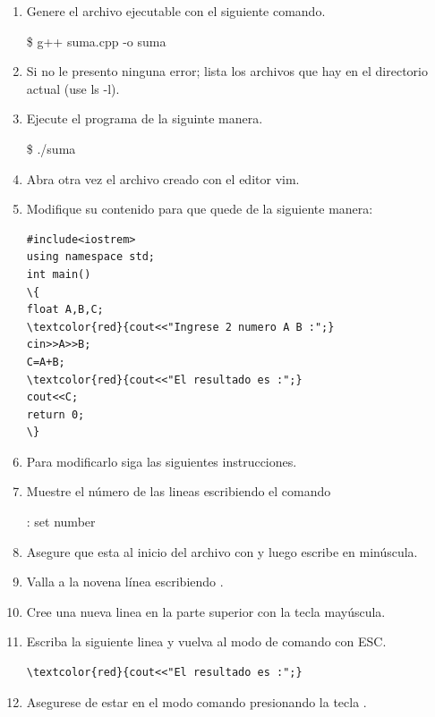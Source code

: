 \documentclass[a4paper,12pt,spanish]{article}
\begin{document}
\begin{enumerate}
  \item Genere el archivo ejecutable con el siguiente comando.

  
    \begin{tcolorbox}[colback=gray!5]
    \$ g++   suma.cpp   -o   suma
  \end{tcolorbox}

  \item Si no le presento ninguna error; lista los archivos que hay en el directorio actual (use ls
    -l).

  \item Ejecute el programa de la siguinte manera.
    
    \begin{tcolorbox}[colback=gray!5]
    \$ ./suma
  \end{tcolorbox}

  
\item Abra otra vez el archivo creado con el editor vim.
  \item Modifique su contenido para que quede de la siguiente manera:

\begin{Verbatim}[commandchars=\\\{\}]
#include<iostrem>
using namespace std;
int main()
\{
float A,B,C;
\textcolor{red}{cout<<"Ingrese 2 numero A B :";}
cin>>A>>B;
C=A+B;
\textcolor{red}{cout<<"El resultado es :";}
cout<<C;
return 0;
\}
\end{Verbatim}


\item Para modificarlo siga las siguientes instrucciones.
\item Muestre el número de las lineas escribiendo el comando
    \begin{tcolorbox}[colback=gray!5]
    : set number
  \end{tcolorbox}
\item Asegure que esta al inicio del archivo con  y
luego escribe  en minúscula.
\item Valla a la novena línea escribiendo \fbox{\Large :}
.
\item Cree una nueva linea en la parte superior con la tecla  mayúscula.
\item Escriba la siguiente linea y vuelva al modo de comando con ESC.
\begin{Verbatim}[commandchars=\\\{\}]
\textcolor{red}{cout<<"El resultado es :";}
\end{Verbatim}
\item Asegurese de estar en el modo comando presionando la tecla .
  

\end{enumerate}
\end{document}
